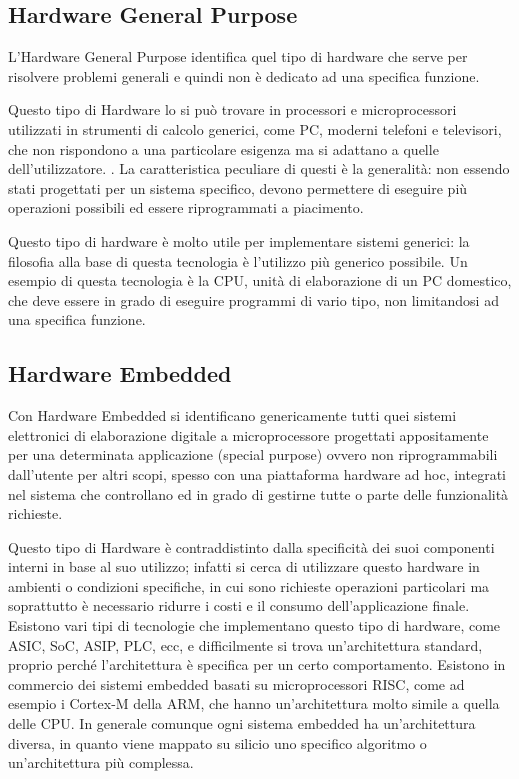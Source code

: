 \documentclass[a4paper,titlepage]{book}
\begin{document}
\subsection{Hardware General Purpose}
L'Hardware General Purpose identifica quel tipo di hardware che serve per risolvere problemi generali e quindi non è dedicato ad una specifica funzione. 

Questo tipo di Hardware lo si può trovare in processori e microprocessori utilizzati in strumenti di calcolo generici, come PC, moderni telefoni e televisori, che non rispondono a una particolare esigenza ma si adattano a quelle dell'utilizzatore. . La caratteristica peculiare di questi è la generalità: non essendo stati progettati per un sistema specifico, devono permettere di eseguire più operazioni possibili ed essere riprogrammati a piacimento.

Questo tipo di hardware è molto utile per implementare sistemi generici: la filosofia alla base di questa tecnologia è l'utilizzo più generico possibile. Un esempio di questa tecnologia è la CPU, unità di elaborazione di un PC domestico, che deve essere in grado di eseguire programmi di vario tipo, non limitandosi ad una specifica funzione.

\subsection{Hardware Embedded}

Con Hardware Embedded si identificano genericamente tutti quei sistemi elettronici di elaborazione digitale a microprocessore progettati appositamente per una determinata applicazione (special purpose) ovvero non riprogrammabili dall'utente per altri scopi, spesso con una piattaforma hardware ad hoc, integrati nel sistema che controllano ed in grado di gestirne tutte o parte delle funzionalità richieste.

Questo tipo di Hardware è contraddistinto dalla specificità dei suoi componenti interni in base al suo utilizzo; infatti si cerca di utilizzare questo hardware in ambienti o condizioni specifiche, in cui sono richieste operazioni particolari ma soprattutto è necessario ridurre i costi e il consumo dell'applicazione finale.
Esistono  vari tipi di tecnologie che implementano questo tipo di hardware, come ASIC, SoC, ASIP, PLC, ecc, e difficilmente si trova un'architettura standard, proprio perché l'architettura è specifica per un certo comportamento. Esistono in commercio dei sistemi embedded basati su microprocessori RISC, come ad esempio i Cortex-M della ARM, che hanno un'architettura molto simile a quella delle CPU. In generale comunque ogni sistema embedded ha un'architettura diversa, in quanto viene mappato su silicio uno specifico algoritmo o un'architettura più complessa.
\end{document}
